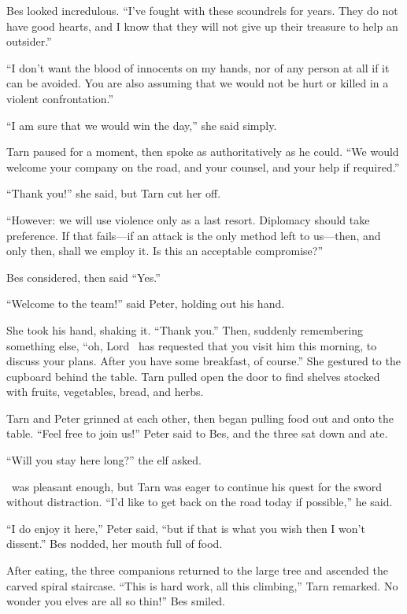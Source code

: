 Bes looked incredulous.  ``I've fought with these scoundrels for years.  They do not have good hearts, and I know that they will not give up their treasure to help an outsider.''

``I don't want the blood of innocents on my hands, nor of any person at all if it can be avoided.  You are also assuming that we would not be hurt or killed in a violent confrontation.''

``I am sure that we would win the day,'' she said simply.

Tarn paused for a moment, then spoke as authoritatively as he could.  ``We would welcome your company on the road, and your counsel, and your help if required.''

``Thank you!'' she said, but Tarn cut her off.

``However: we will use violence only as a last resort.  Diplomacy should take preference.  If that fails---if an attack is the only method left to us---then, and only then, shall we employ it.  Is this an acceptable compromise?''

Bes considered, then said ``Yes.''

``Welcome to the team!'' said Peter, holding out his hand.

She took his hand, shaking it.  ``Thank you.'' Then, suddenly remembering something else, ``oh, Lord \arilor\ has requested that you visit him this morning, to discuss your plans.  After you have some breakfast, of course.''  She gestured to the cupboard behind the table.  Tarn pulled open the door to find shelves stocked with fruits, vegetables, bread, and herbs.

Tarn and Peter grinned at each other, then began pulling food out and onto the table.  ``Feel free to join us!'' Peter said to Bes, and the three sat down and ate.

``Will you stay here long?'' the elf asked.

\inarthonor\ was pleasant enough, but Tarn was eager to continue his quest for the sword without distraction. ``I'd like to get back on the road today if possible,'' he said.

``I do enjoy it here,'' Peter said, ``but if that is what you wish then I won't dissent.''  Bes nodded, her mouth full of food.

After eating, the three companions returned to the large tree and ascended the carved spiral staircase.  ``This is hard work, all this climbing,'' Tarn remarked.  No wonder you elves are all so thin!''  Bes smiled.

